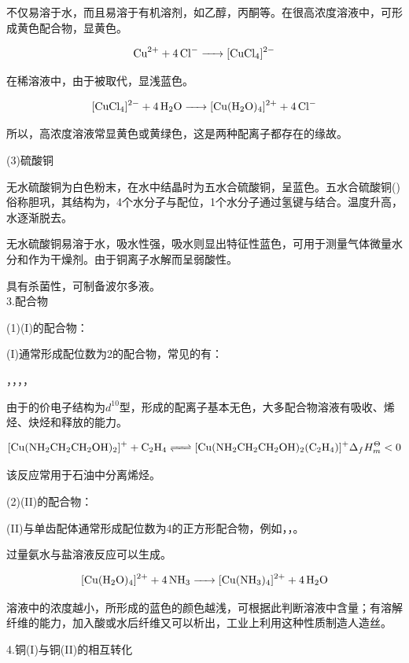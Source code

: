 \documentclass[a4paper,UTF8]{article}
\begin{document}
不仅易溶于水，而且易溶于有机溶剂，如乙醇，丙酮等。在很高浓度溶液中，可形成黄色配合物，显黄色。

$$ \ce{Cu^{2+} + 4Cl- -> [CuCl4]^{2-}} $$

在稀溶液中，由于被取代，显浅蓝色。

$$ \ce{[CuCl4]^{2-} + 4H2O -> [Cu(H2O)4]^{2+} + 4Cl-} $$

所以，高浓度溶液常显黄色或黄绿色，这是两种配离子都存在的缘故。

(3)硫酸铜

无水硫酸铜为白色粉末，在水中结晶时为五水合硫酸铜，呈蓝色。五水合硫酸铜()俗称胆巩，其结构为，4个水分子与配位，1个水分子通过氢键与结合。温度升高，水逐渐脱去。

无水硫酸铜易溶于水，吸水性强，吸水则显出特征性蓝色，可用于测量气体微量水分和作为干燥剂。由于铜离子水解而呈弱酸性。

具有杀菌性，可制备波尔多液。\\

3.配合物

(1)(I)的配合物：

(I)通常形成配位数为2的配合物，常见的有：

\ce{[Cu(SCN)2]+}，\ce{[CuCl2]-}，\ce{[Cu(NH3)2]+}，，\ce{[Cu(CN)2]-}

由于的价电子结构为$d^{10}$型，形成的配离子基本无色，大多配合物溶液有吸收、烯烃、炔烃和释放的能力。

$$ \ce{[Cu(NH2CH2CH2OH)2]+ + C2H4 <=> [Cu(NH2CH2CH2OH)2(C2H4)]+} \Delta _{f}H^{\Theta}_{m}<0$$

该反应常用于石油中分离烯烃。

(2)(II)的配合物：

(II)与单齿配体通常形成配位数为4的正方形配合物，例如，，。

过量氨水与盐溶液反应可以生成。

$$ \ce{[Cu(H2O)4]^{2+} + 4NH3 -> [Cu(NH3)4]^{2+} + 4H2O} $$

溶液中的浓度越小，所形成的蓝色的颜色越浅，可根据此判断溶液中含量；有溶解纤维的能力，加入酸或水后纤维又可以析出，工业上利用这种性质制造人造丝。

4.铜(I)与铜(II)的相互转化
\end{document}

